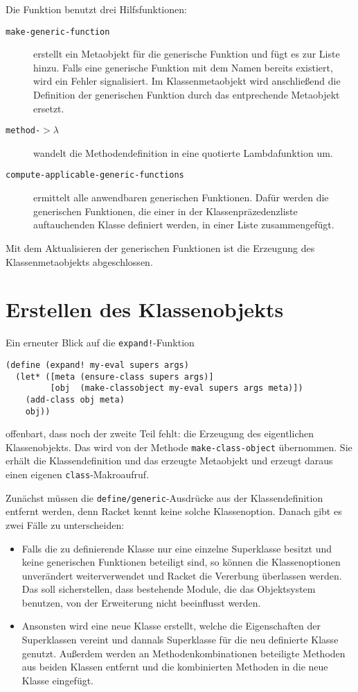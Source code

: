 Die Funktion benutzt drei Hilfsfunktionen:
\begin{description}
\item[\texttt{make-generic-function}] erstellt ein Metaobjekt für die generische Funktion und fügt es zur Liste hinzu. Falls eine generische Funktion mit dem Namen bereits existiert, wird ein Fehler signalisiert. Im Klassenmetaobjekt wird anschließend die Definition der generischen Funktion durch das entprechende Metaobjekt ersetzt.

\item[\texttt{method-$>\lambda$}] wandelt die Methodendefinition in eine quotierte Lambdafunktion um.

\item[\texttt{compute-applicable-generic-functions}] ermittelt alle anwendbaren generischen Funktionen. Dafür werden die generischen Funktionen, die einer in der Klassenpräzedenzliste auftauchenden Klasse definiert werden, in einer Liste zusammengefügt.
\end{description}

Mit dem Aktualisieren der generischen Funktionen ist die Erzeugung des Klassenmetaobjekts abgeschlossen.

\section{Erstellen des Klassenobjekts}

Ein erneuter Blick auf die \texttt{expand!}-Funktion

\begin{lstlisting}
(define (expand! my-eval supers args)
  (let* ([meta (ensure-class supers args)]
         [obj  (make-classobject my-eval supers args meta)])
    (add-class obj meta)
    obj))
\end{lstlisting}

offenbart, dass noch der zweite Teil fehlt: die Erzeugung des eigentlichen Klassenobjekts. Das wird von der Methode \texttt{make-class-object} übernommen. Sie erhält die Klassendefinition und das erzeugte Metaobjekt und erzeugt daraus einen eigenen \texttt{class}-Makroaufruf.

Zunächst müssen die \texttt{define/generic}-Ausdrücke aus der Klassendefinition entfernt werden, denn Racket kennt keine solche Klassenoption. Danach gibt es zwei Fälle zu unterscheiden:
\begin{itemize}
 \item Falls die zu definierende Klasse nur eine einzelne Superklasse besitzt und keine generischen Funktionen beteiligt sind, so können die Klassenoptionen unverändert weiterverwendet und Racket die Vererbung überlassen werden. Das soll sicherstellen, dass bestehende Module, die das Objektsystem benutzen, von der Erweiterung nicht beeinflusst werden.
 \item Ansonsten wird eine neue Klasse erstellt, welche die Eigenschaften der Superklassen vereint und dannals Superklasse für die neu definierte Klasse genutzt. Außerdem werden an  Methodenkombinationen beteiligte Methoden aus beiden Klassen entfernt und die kombinierten Methoden in die neue Klasse eingefügt.
\end{itemize}

